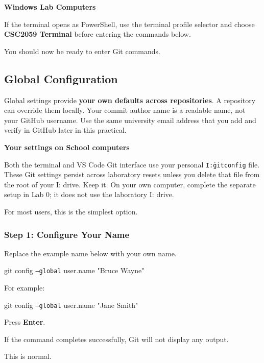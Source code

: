 \documentclass{csc2059practical}
\begin{document}
\begin{importantnote}
\textbf{Windows Lab Computers}\par
\medskip

If the terminal opens as PowerShell, use the terminal profile selector and choose \textbf{CSC2059 Terminal} before entering the commands below.
\end{importantnote}

You should now be ready to enter Git commands.

\subsection{Global Configuration}
Global settings provide \textbf{your own defaults across repositories}. A repository can override them locally. Your commit author name is a readable name, not your GitHub username. Use the same university email address that you add and verify in GitHub later in this practical.

\begin{importantnote}
\textbf{Your settings on School computers}

Both the terminal and VS Code Git interface use your personal \texttt{I:\.gitconfig} file. These Git settings persist across laboratory resets unless you delete that file from the root of your I: drive. Keep it. On your own computer, complete the separate setup in Lab 0; it does not use the laboratory I: drive.
\end{importantnote}

For most users, this is the simplest option.

\subsubsection{Step 1: Configure Your Name}
Replace the example name below with your own name.

\begin{terminalplain}
git config \texttt{--global} user.name "Bruce Wayne"
\end{terminalplain}
For example:

\begin{terminalplain}
git config \texttt{--global} user.name "Jane Smith"
\end{terminalplain}
Press \textbf{Enter}.

If the command completes successfully, Git will not display any output.

This is normal.
\end{document}
